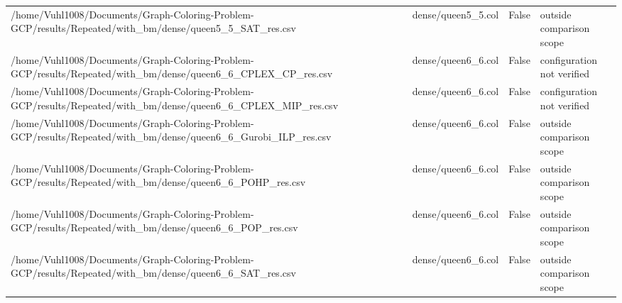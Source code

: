 \begin{table}[htbp]
\begin{tabular}{llll}
/home/Vuhl1008/Documents/Graph-Coloring-Problem-GCP/results/Repeated/with\_bm/dense/queen5\_5\_SAT\_res.csv & dense/queen5\_5.col & False & outside comparison scope \\
/home/Vuhl1008/Documents/Graph-Coloring-Problem-GCP/results/Repeated/with\_bm/dense/queen6\_6\_CPLEX\_CP\_res.csv & dense/queen6\_6.col & False & configuration not verified \\
/home/Vuhl1008/Documents/Graph-Coloring-Problem-GCP/results/Repeated/with\_bm/dense/queen6\_6\_CPLEX\_MIP\_res.csv & dense/queen6\_6.col & False & configuration not verified \\
/home/Vuhl1008/Documents/Graph-Coloring-Problem-GCP/results/Repeated/with\_bm/dense/queen6\_6\_Gurobi\_ILP\_res.csv & dense/queen6\_6.col & False & outside comparison scope \\
/home/Vuhl1008/Documents/Graph-Coloring-Problem-GCP/results/Repeated/with\_bm/dense/queen6\_6\_POHP\_res.csv & dense/queen6\_6.col & False & outside comparison scope \\
/home/Vuhl1008/Documents/Graph-Coloring-Problem-GCP/results/Repeated/with\_bm/dense/queen6\_6\_POP\_res.csv & dense/queen6\_6.col & False & outside comparison scope \\
/home/Vuhl1008/Documents/Graph-Coloring-Problem-GCP/results/Repeated/with\_bm/dense/queen6\_6\_SAT\_res.csv & dense/queen6\_6.col & False & outside comparison scope \\
\hline
\end{tabular}
\end{table}
